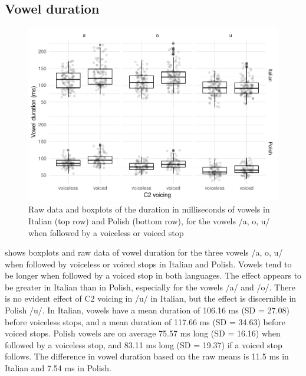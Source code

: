 \documentclass[charis]{glossa}
\begin{document}
\hypertarget{vowel-duration}{%
\subsection{Vowel duration}\label{vowel-duration}}

\label{s:vduration}

\begin{figure}
\includegraphics[width=\linewidth]{2018-relrel_files/figure-latex/Figure2} \caption{Raw data and boxplots of the duration in milliseconds of vowels in Italian (top row) and Polish (bottom row), for the vowels /a, o, u/ when followed by a voiceless or voiced stop}\label{f:Figure2}
\end{figure}

 shows boxplots and raw data of vowel duration for the
three vowels /a, o, u/ when followed by voiceless or voiced stops in
Italian and Polish. Vowels tend to be longer when followed by a voiced
stop in both languages. The effect appears to be greater in Italian than
in Polish, especially for the vowels /a/ and /o/. There is no evident
effect of C2 voicing in /u/ in Italian, but the effect is discernible in
Polish /u/. In Italian, vowels have a mean duration of 106.16 ms (SD =
27.08) before voiceless stops, and a mean duration of 117.66 ms (SD =
34.63) before voiced stops. Polish vowels are on average 75.57 ms long
(SD = 16.16) when followed by a voiceless stop, and 83.11 ms long (SD =
19.37) if a voiced stop follows. The difference in vowel duration based
on the raw means is 11.5 ms in Italian and 7.54 ms in Polish.
\end{document}
